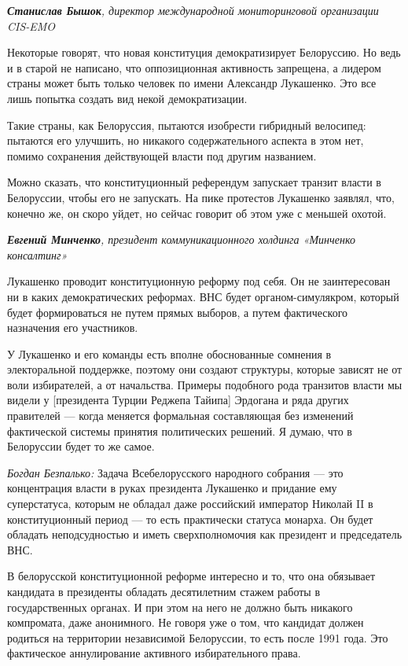 \textit{\textbf{Станислав Бышок}, директор международной мониторинговой организации CIS-EMO}

Некоторые говорят, что новая конституция демократизирует Белоруссию. Но ведь и в старой не написано, что оппозиционная активность запрещена, а лидером страны может быть только человек по имени Александр Лукашенко. Это все лишь попытка создать вид некой демократизации.

Такие страны, как Белоруссия, пытаются изобрести гибридный велосипед: пытаются его улучшить, но никакого содержательного аспекта в этом нет, помимо сохранения действующей власти под другим названием.

Можно сказать, что конституционный референдум запускает транзит власти в Белоруссии, чтобы его не запускать. На пике протестов Лукашенко заявлял, что, конечно же, он скоро уйдет, но сейчас говорит об этом уже с меньшей охотой.

\textit{\textbf{Евгений Минченко}, президент коммуникационного холдинга «Минченко консалтинг» }

Лукашенко проводит конституционную реформу под себя. Он не заинтересован ни в каких демократических реформах. ВНС будет органом-симулякром, который будет формироваться не путем прямых выборов, а путем фактического назначения его участников.

У Лукашенко и его команды есть вполне обоснованные сомнения в электоральной поддержке, поэтому они создают структуры, которые зависят не от воли избирателей, а от начальства. Примеры подобного рода транзитов власти мы видели у [президента Турции Реджепа Тайипа] Эрдогана и ряда других правителей — когда меняется формальная составляющая без изменений фактической системы принятия политических решений. Я думаю, что в Белоруссии будет то же самое.

\textit{Богдан Безпалько:} Задача Всебелорусского народного собрания — это концентрация власти в руках президента Лукашенко и придание ему суперстатуса, которым не обладал даже российский император Николай II в конституционный период — то есть практически статуса монарха. Он будет обладать неподсудностью и иметь сверхполномочия как президент и председатель ВНС.

В белорусской конституционной реформе интересно и то, что она обязывает кандидата в президенты обладать десятилетним стажем работы в государственных органах. И при этом на него не должно быть никакого компромата, даже анонимного. Не говоря уже о том, что кандидат должен родиться на территории независимой Белоруссии, то есть после 1991 года. Это фактическое аннулирование активного избирательного права.

